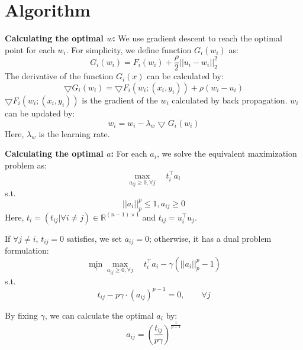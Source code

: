 {\section{Algorithm}
\textbf{Calculating the optimal $w$:} We use gradient descent to reach the optimal point for each $w_i$.
For simplicity, we define function $G_i(w_i)$ as:
\begin{equation}
    G_{i}(w_i) = F_i(w_i) + \frac{\rho}{2}||u_i - w_i||_{2}^{2}
\end{equation}
The derivative of the function $G_i(x)$ can be calculated by:
\begin{equation}
    \bigtriangledown G_i(w_i) = \bigtriangledown F_i(w_i; (x_i, y_i)) + \rho (w_i - u_i)
\end{equation}
$\bigtriangledown F_i(w_i; (x_i, y_i))$ is the gradient of the $w_i$ calculated by back propagation.
$w_i$ can be updated by:
\begin{equation}
\label{equation_train-wi}
    w_i = w_i - \lambda_{w} \bigtriangledown G_i(w_i)
\end{equation}
Here, $\lambda_{w}$ is the learning rate.

\textbf{Calculating the optimal $a$:} For each $a_i$, we solve the equivalent maximization problem as:
\begin{equation}
    \max_{a_{ij} \geq 0, \forall j} \quad t_{i}^{\top}a_{i}
\end{equation}
s.t.
\begin{equation}
\label{equation_constraint-p-norm_singlei}
    ||a_i|| _{p}^{p} \leq 1, a_{ij}\geq 0
\end{equation}
Here, $t_i = (t_{ij}|\forall i \neq j) \in \mathbb{R}^{(n-1) \times 1}$ and $t_{ij} = u_{i}^{\top}u_{j}$.

If $\forall j \neq i$, $t_{ij}=0$ satisfies, we set $a_{ij}=0$; otherwise, it has a dual problem formulation:
\begin{equation}
    \min_{\gamma}\max_{a_{ij} \geq 0, \forall j} \quad  t_{i}^{\top}a_{i} - \gamma (||a_{i}||_{p}^{p} - 1)
\end{equation}
s.t.
\begin{equation}
    t_{ij} - p\gamma \cdot (a_{ij})^{p-1} = 0, \quad \quad \forall j
\end{equation}

By fixing $\gamma$, we can calculate the optimal $a_{i}$ by:
\begin{equation}
    a_{ij} = (\frac{t_{ij}}{p\gamma})^{\frac{1}{p-1}}
\end{equation}

}
